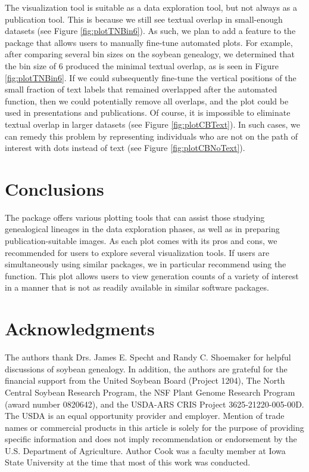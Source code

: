 \documentclass[article,shortnames]{jss}
\begin{document}
The  visualization tool  is suitable as a data exploration tool, but not always as a publication tool. This is because we still see textual overlap in small-enough datasets (see Figure \ref{fig:plotTNBin6}). As such, we plan to add a feature to the package that allows users to manually fine-tune automated plots. For example, after comparing several bin sizes on the soybean genealogy, we determined that the bin size of 6 produced the minimal textual overlap, as is seen in Figure \ref{fig:plotTNBin6}. If we could subsequently fine-tune the vertical positions of the small fraction of text labels that remained overlapped after the automated  function, then we could potentially remove all overlaps, and the plot could be used in presentations and publications. Of course, it is impossible to eliminate textual overlap in larger datasets (see Figure \ref{fig:plotCBText}). In such cases, we can remedy this problem by representing individuals who are not on the path of interest with dots instead of text (see Figure \ref{fig:plotCBNoText}).

\section{Conclusions}

The  package offers various plotting tools that can assist those studying genealogical lineages in the data exploration phases, as well as in preparing publication-suitable images. As each plot comes with its pros and cons, we recommended for users to explore several visualization tools. If users are simultaneously using similar packages, we in particular recommend using the  function. This plot allows users to view generation counts of a variety of interest in a manner that is not as readily available in similar software packages.

\section*{Acknowledgments}

The authors thank Drs. James E. Specht and Randy C. Shoemaker for helpful discussions of soybean genealogy. In addition, the authors are grateful for the financial support from the United Soybean Board (Project 1204), The North Central Soybean Research Program, the NSF Plant Genome Research Program (award number 0820642), and the USDA-ARS CRIS Project 3625-21220-005-00D. The USDA is an equal opportunity provider and employer. Mention of trade names or commercial products in this article is solely for the purpose of providing specific information and does not imply recommendation or endorsement by the U.S. Department of Agriculture. Author Cook was a faculty member at Iowa State University at the time that most of this work was conducted.

\clearpage


\end{document}
